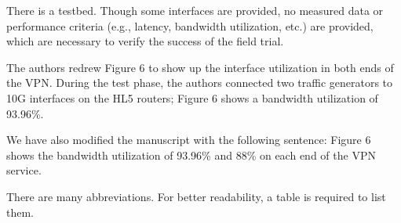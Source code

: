 \documentclass[12pt]{journalrebuttal}
\begin{document}
\begin{revcomment}
There is a testbed. Though some interfaces are provided, no measured data or performance criteria (e.g., latency, bandwidth utilization, etc.) are provided, which are necessary to verify the success of the field trial.
\end{revcomment}

\begin{response}
The authors redrew Figure 6 to show up the interface utilization in both ends of the VPN. During the test phase, the authors connected two traffic generators to 10G interfaces on the HL5 routers; Figure 6 shows a bandwidth utilization of 93.96\%.

We have also modified the manuscript with the following sentence:
Figure 6 shows the bandwidth utilization of 93.96\% and 88\% on each end of the VPN service.
\end{response}

\begin{revcomment}
There are many abbreviations. For better readability, a table is required to list them.
\end{revcomment}
\end{document}
